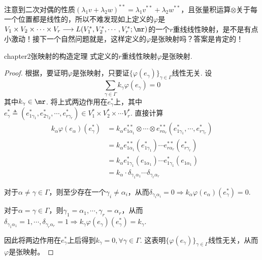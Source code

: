 注意到二次对偶的性质$(\lambda_{1}v+\lambda_{2}w)^{\ast\ast}=\lambda_{1}v^{\ast\ast}+\lambda_{2}w^{\ast\ast}$，且张量积运算$\otimes$关于每一个位置都是线性的，所以不难发现如上定义的$\varphi$是$V_{1}\times V_{2}\times\cdots\times V_{r}\longrightarrow L(V^{\ast}_{1}, V^{\ast}_{2},\cdots ,V^{\ast}_{r};\mr)$的一个$r$重线线性映射，是不是有点小激动！接下一个自然问题就是，这样定义的$\varphi$是张映射吗？答案是肯定的！
\begin{mythm}{}{chapter2张映射的构造定理}
	式定义的$r$重线性映射$\varphi$是张映射.
\end{mythm}
\begin{proof}
	根据，要证明$\varphi$是张映射，只要证$\{\varphi(e_{\gamma}) \}_{\gamma\in \Gamma}$线性无关. 设
\begin{equation}
	\sum_{ \gamma\in \Gamma }k_{\gamma}\varphi(e_{\gamma})=0
\end{equation}
	其中$k_{\gamma}\in \mr$. 将上式两边作用在$e^{\ast}_{\gamma}$上，其中$e^{\ast}_{\gamma}\triangleq (e^{\ast}_{1\gamma_{1}},e^{\ast}_{2\gamma_{2}},\cdots,e^{\ast}_{r\gamma_{r}})\in V^{\ast}_{1}\times V^{\ast}_{2}\times\cdots V^{\ast}_{r}$. 直接计算
	\[
	\begin{split}
	k_{\alpha}\varphi(e_{\alpha})(e^{\ast}_{\gamma})&=k_{\alpha}e^{\ast\ast}_{1\alpha_{1}}\otimes \cdots\otimes e^{\ast\ast}_{r\alpha_{r}}\left(e^{\ast}_{1\gamma_{1}},\cdots,e^{\ast}_{r\gamma_{r}} \right)\\
	&=k_{\alpha}e^{\ast\ast}_{1\alpha_{ 1 }}\left(e^{\ast}_{1\gamma_{1}} \right)\cdots e^{\ast\ast}_{r\alpha_{ r }}\left(e^{\ast}_{r\gamma_{r}} \right)\\
	&=k_{\alpha}e^{\ast}_{1\gamma_{1}}\left(e_{1\alpha_{ 1 }} \right)\cdots e^{\ast}_{1\gamma_{1}}\left(e_{1\alpha_{ 1 }} \right)\\
	&=k_{\alpha}\cdot \delta_{ \gamma_{1} \alpha_{ 1 } }\cdots \delta_{ \gamma_{r} \alpha_{ r } }
	\end{split}
	\]
	
	对于$\alpha\neq \gamma\in \Gamma$，则至少存在一个$\gamma_{ i }\neq\alpha_{ i }$，从而$\delta_{ \gamma_{i} \alpha_{ i } }=0\Rightarrow k_{\alpha}\varphi(e_{\alpha})(e^{\ast}_{\gamma})=0$.
	
	对于$\alpha=\gamma\in\Gamma$，则$\gamma_{1}=\alpha_{ 1 },\cdots,\gamma_{r}=\alpha_{ r }$，从而$\delta_{ \gamma_{1} \alpha_{ 1 } }=1,\cdots, \delta_{ \gamma_{r} \alpha_{ r } }=1\Rightarrow k_{\gamma}\varphi(e_{\gamma})(e^{\ast}_{\gamma})=k_{\gamma}$. 
	
	因此将两边作用在$e^{\ast}_{\gamma}$上后得到$k_{\gamma}=0,\forall \gamma\in \Gamma$. 这表明$\{\varphi(e_{\gamma}) \}_{\gamma\in \Gamma}$线性无关，从而$\varphi$是张映射。
\end{proof}

